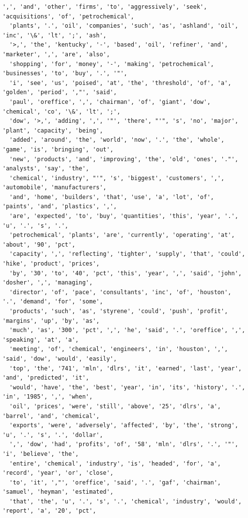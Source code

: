 \documentclass[11pt]{article}
\begin{document}
\begin{Verbatim}[commandchars=\\\{\}]
  ',', 'and', 'other', 'firms', 'to', 'aggressively', 'seek', 'acquisitions', 'of', 'petrochemical',
  'plants', '.', 'oil', 'companies', 'such', 'as', 'ashland', 'oil', 'inc', '\&', 'lt', ';', 'ash',
  '>,', 'the', 'kentucky', '-', 'based', 'oil', 'refiner', 'and', 'marketer', ',', 'are', 'also',
  'shopping', 'for', 'money', '-', 'making', 'petrochemical', 'businesses', 'to', 'buy', '.', '"',
  'i', 'see', 'us', 'poised', 'at', 'the', 'threshold', 'of', 'a', 'golden', 'period', ',"', 'said',
  'paul', 'oreffice', ',', 'chairman', 'of', 'giant', 'dow', 'chemical', 'co', '\&', 'lt', ';',
  'dow', '>,', 'adding', ',', '"', 'there', "'", 's', 'no', 'major', 'plant', 'capacity', 'being',
  'added', 'around', 'the', 'world', 'now', '.', 'the', 'whole', 'game', 'is', 'bringing', 'out',
  'new', 'products', 'and', 'improving', 'the', 'old', 'ones', '."', 'analysts', 'say', 'the',
  'chemical', 'industry', "'", 's', 'biggest', 'customers', ',', 'automobile', 'manufacturers',
  'and', 'home', 'builders', 'that', 'use', 'a', 'lot', 'of', 'paints', 'and', 'plastics', ',',
  'are', 'expected', 'to', 'buy', 'quantities', 'this', 'year', '.', 'u', '.', 's', '.',
  'petrochemical', 'plants', 'are', 'currently', 'operating', 'at', 'about', '90', 'pct',
  'capacity', ',', 'reflecting', 'tighter', 'supply', 'that', 'could', 'hike', 'product', 'prices',
  'by', '30', 'to', '40', 'pct', 'this', 'year', ',', 'said', 'john', 'dosher', ',', 'managing',
  'director', 'of', 'pace', 'consultants', 'inc', 'of', 'houston', '.', 'demand', 'for', 'some',
  'products', 'such', 'as', 'styrene', 'could', 'push', 'profit', 'margins', 'up', 'by', 'as',
  'much', 'as', '300', 'pct', ',', 'he', 'said', '.', 'oreffice', ',', 'speaking', 'at', 'a',
  'meeting', 'of', 'chemical', 'engineers', 'in', 'houston', ',', 'said', 'dow', 'would', 'easily',
  'top', 'the', '741', 'mln', 'dlrs', 'it', 'earned', 'last', 'year', 'and', 'predicted', 'it',
  'would', 'have', 'the', 'best', 'year', 'in', 'its', 'history', '.', 'in', '1985', ',', 'when',
  'oil', 'prices', 'were', 'still', 'above', '25', 'dlrs', 'a', 'barrel', 'and', 'chemical',
  'exports', 'were', 'adversely', 'affected', 'by', 'the', 'strong', 'u', '.', 's', '.', 'dollar',
  ',', 'dow', 'had', 'profits', 'of', '58', 'mln', 'dlrs', '.', '"', 'i', 'believe', 'the',
  'entire', 'chemical', 'industry', 'is', 'headed', 'for', 'a', 'record', 'year', 'or', 'close',
  'to', 'it', ',"', 'oreffice', 'said', '.', 'gaf', 'chairman', 'samuel', 'heyman', 'estimated',
  'that', 'the', 'u', '.', 's', '.', 'chemical', 'industry', 'would', 'report', 'a', '20', 'pct',

\end{Verbatim}
\end{document}
